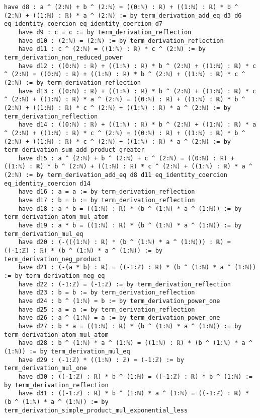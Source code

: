 \documentclass{article}
\begin{document}
\begin{tcolorbox}[colback=white!10, width=\linewidth]
\begin{lstlisting}[language=Lean4]
    have d8 : a ^ (2:ℕ) + b ^ (2:ℕ) = ((0:ℕ) : ℝ) + ((1:ℕ) : ℝ) * b ^ (2:ℕ) + ((1:ℕ) : ℝ) * a ^ (2:ℕ) := by term_derivation_add_eq d3 d6 eq_identity_coercion eq_identity_coercion d7
    have d9 : c = c := by term_derivation_reflection
    have d10 : (2:ℕ) = (2:ℕ) := by term_derivation_reflection
    have d11 : c ^ (2:ℕ) = ((1:ℕ) : ℝ) * c ^ (2:ℕ) := by term_derivation_non_reduced_power
    have d12 : ((0:ℕ) : ℝ) + ((1:ℕ) : ℝ) * b ^ (2:ℕ) + ((1:ℕ) : ℝ) * c ^ (2:ℕ) = ((0:ℕ) : ℝ) + ((1:ℕ) : ℝ) * b ^ (2:ℕ) + ((1:ℕ) : ℝ) * c ^ (2:ℕ) := by term_derivation_reflection
    have d13 : ((0:ℕ) : ℝ) + ((1:ℕ) : ℝ) * b ^ (2:ℕ) + ((1:ℕ) : ℝ) * c ^ (2:ℕ) + ((1:ℕ) : ℝ) * a ^ (2:ℕ) = ((0:ℕ) : ℝ) + ((1:ℕ) : ℝ) * b ^ (2:ℕ) + ((1:ℕ) : ℝ) * c ^ (2:ℕ) + ((1:ℕ) : ℝ) * a ^ (2:ℕ) := by term_derivation_reflection
    have d14 : ((0:ℕ) : ℝ) + ((1:ℕ) : ℝ) * b ^ (2:ℕ) + ((1:ℕ) : ℝ) * a ^ (2:ℕ) + ((1:ℕ) : ℝ) * c ^ (2:ℕ) = ((0:ℕ) : ℝ) + ((1:ℕ) : ℝ) * b ^ (2:ℕ) + ((1:ℕ) : ℝ) * c ^ (2:ℕ) + ((1:ℕ) : ℝ) * a ^ (2:ℕ) := by term_derivation_sum_add_product_greater
    have d15 : a ^ (2:ℕ) + b ^ (2:ℕ) + c ^ (2:ℕ) = ((0:ℕ) : ℝ) + ((1:ℕ) : ℝ) * b ^ (2:ℕ) + ((1:ℕ) : ℝ) * c ^ (2:ℕ) + ((1:ℕ) : ℝ) * a ^ (2:ℕ) := by term_derivation_add_eq d8 d11 eq_identity_coercion eq_identity_coercion d14
    have d16 : a = a := by term_derivation_reflection
    have d17 : b = b := by term_derivation_reflection
    have d18 : a * b = ((1:ℕ) : ℝ) * (b ^ (1:ℕ) * a ^ (1:ℕ)) := by term_derivation_atom_mul_atom
    have d19 : a * b = ((1:ℕ) : ℝ) * (b ^ (1:ℕ) * a ^ (1:ℕ)) := by term_derivation_mul_eq
    have d20 : (-(((1:ℕ) : ℝ) * (b ^ (1:ℕ) * a ^ (1:ℕ))) : ℝ) = ((-1:ℤ) : ℝ) * (b ^ (1:ℕ) * a ^ (1:ℕ)) := by term_derivation_neg_product
    have d21 : (-(a * b) : ℝ) = ((-1:ℤ) : ℝ) * (b ^ (1:ℕ) * a ^ (1:ℕ)) := by term_derivation_neg_eq
    have d22 : (-1:ℤ) = (-1:ℤ) := by term_derivation_reflection
    have d23 : b = b := by term_derivation_reflection
    have d24 : b ^ (1:ℕ) = b := by term_derivation_power_one
    have d25 : a = a := by term_derivation_reflection
    have d26 : a ^ (1:ℕ) = a := by term_derivation_power_one
    have d27 : b * a = ((1:ℕ) : ℝ) * (b ^ (1:ℕ) * a ^ (1:ℕ)) := by term_derivation_atom_mul_atom
    have d28 : b ^ (1:ℕ) * a ^ (1:ℕ) = ((1:ℕ) : ℝ) * (b ^ (1:ℕ) * a ^ (1:ℕ)) := by term_derivation_mul_eq
    have d29 : (-1:ℤ) * ((1:ℕ) : ℤ) = (-1:ℤ) := by term_derivation_mul_one
    have d30 : ((-1:ℤ) : ℝ) * b ^ (1:ℕ) = ((-1:ℤ) : ℝ) * b ^ (1:ℕ) := by term_derivation_reflection
    have d31 : ((-1:ℤ) : ℝ) * b ^ (1:ℕ) * a ^ (1:ℕ) = ((-1:ℤ) : ℝ) * (b ^ (1:ℕ) * a ^ (1:ℕ)) := by term_derivation_simple_product_mul_exponential_less

\end{lstlisting}
\end{tcolorbox}
\end{document}
